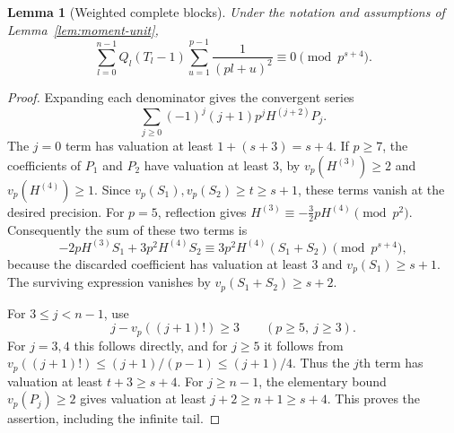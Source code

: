 \documentclass[11pt]{amsart}
\newtheorem{lemma}[theorem]{Lemma}
\theoremstyle{definition}
\theoremstyle{remark}
\begin{document}
\begin{lemma}[Weighted complete blocks]\label{lem:weighted-complete}
Under the notation and assumptions of Lemma~\ref{lem:moment-unit},
\[
\sum_{l=0}^{n-1}Q_l(T_l-1)
 \sum_{u=1}^{p-1}\frac1{(pl+u)^2}\equiv0\pmod{p^{s+4}}.
\]
\end{lemma}
\begin{proof}
Expanding each denominator gives the convergent series
\[
\sum_{j\ge0}(-1)^j(j+1)p^jH^{(j+2)}P_j.
\]
The $j=0$ term has valuation at least $1+(s+3)=s+4$.
If $p\ge7$, the coefficients of $P_1$ and $P_2$ have valuation at least
$3$, by $v_p(H^{(3)})\ge2$ and $v_p(H^{(4)})\ge1$. Since
$v_p(S_1),v_p(S_2)\ge t\ge s+1$, these terms vanish at the desired precision.
For $p=5$, reflection gives
$H^{(3)}\equiv-\tfrac32pH^{(4)}\pmod{p^2}$.
Consequently the sum of these two terms is
\[
-2pH^{(3)}S_1+3p^2H^{(4)}S_2
\equiv3p^2H^{(4)}(S_1+S_2)\pmod{p^{s+4}},
\]
because the discarded coefficient has valuation at least $3$ and
$v_p(S_1)\ge s+1$. The surviving expression vanishes by
$v_p(S_1+S_2)\ge s+2$.

For $3\le j<n-1$, use
\[
j-v_p((j+1)!)\ge3\qquad(p\ge5,\ j\ge3).
\]
For $j=3,4$ this follows directly, and for $j\ge5$ it follows from
$v_p((j+1)!)\le(j+1)/(p-1)\le(j+1)/4$.
Thus the $j$th term has valuation at least $t+3\ge s+4$.
For $j\ge n-1$, the elementary bound $v_p(P_j)\ge2$ gives valuation
at least $j+2\ge n+1\ge s+4$. This proves the assertion, including the
infinite tail.
\end{proof}
\end{document}
